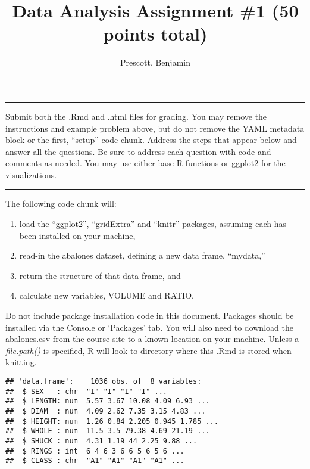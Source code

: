 \documentclass[
]{article}
\title{Data Analysis Assignment \#1 (50 points total)}
\author{Prescott, Benjamin}
\date{}
\providecommand{\tightlist}{%
  \setlength{\itemsep}{0pt}\setlength{\parskip}{0pt}}
\begin{document}
\maketitle

\begin{center}\rule{0.5\linewidth}{0.5pt}\end{center}

Submit both the .Rmd and .html files for grading. You may remove the
instructions and example problem above, but do not remove the YAML
metadata block or the first, ``setup'' code chunk. Address the steps
that appear below and answer all the questions. Be sure to address each
question with code and comments as needed. You may use either base R
functions or ggplot2 for the visualizations.

\begin{center}\rule{0.5\linewidth}{0.5pt}\end{center}

The following code chunk will:

\begin{enumerate}
\def\labelenumi{(\alph{enumi})}
\tightlist
\item
  load the ``ggplot2'', ``gridExtra'' and ``knitr'' packages, assuming
  each has been installed on your machine,
\item
  read-in the abalones dataset, defining a new data frame, ``mydata,''
\item
  return the structure of that data frame, and
\item
  calculate new variables, VOLUME and RATIO.
\end{enumerate}

Do not include package installation code in this document. Packages
should be installed via the Console or `Packages' tab. You will also
need to download the abalones.csv from the course site to a known
location on your machine. Unless a \emph{file.path()} is specified, R
will look to directory where this .Rmd is stored when knitting.

\begin{verbatim}
## 'data.frame':    1036 obs. of  8 variables:
##  $ SEX   : chr  "I" "I" "I" "I" ...
##  $ LENGTH: num  5.57 3.67 10.08 4.09 6.93 ...
##  $ DIAM  : num  4.09 2.62 7.35 3.15 4.83 ...
##  $ HEIGHT: num  1.26 0.84 2.205 0.945 1.785 ...
##  $ WHOLE : num  11.5 3.5 79.38 4.69 21.19 ...
##  $ SHUCK : num  4.31 1.19 44 2.25 9.88 ...
##  $ RINGS : int  6 4 6 3 6 6 5 6 5 6 ...
##  $ CLASS : chr  "A1" "A1" "A1" "A1" ...
\end{verbatim}
\end{document}
